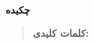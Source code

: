\thispagestyle{empty}
\centerline{\textbf{\large{چکیده}}}
\begin{quote}

\vskip 1cm
\textbf{کلمات کلیدی:} \textiranic{}
\end{quote}